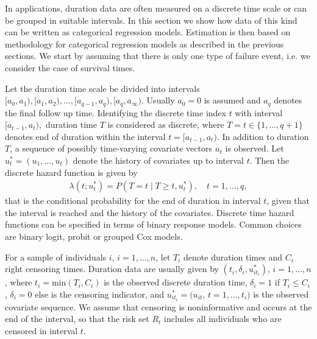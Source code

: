 \documentclass[11pt,a4paper,twoside]{bayesxarticle}
\begin{document}
In applications, duration data are often measured on a discrete time
scale or can be grouped in suitable intervals. In this section we
show how data of this kind can be written as categorical regression
models. Estimation is then based on methodology for categorical
regression models as described in the previous sections. We start by
assuming that there is only one type of failure event, i.e. we
consider the case of survival times.

Let the duration time scale be divided into intervals $\lbrack
a_{0},a_{1}),\lbrack a_{1},a_{2}),\ldots, \lbrack a_{q-1},a_{q}),
\lbrack a_{q},a_{\infty}).$ Usually $a_{0}=0$ is assumed and $a_{q}$
denotes the final follow up time. Identifying the discrete time
index $t$ with interval $\lbrack a_{t-1},a_{t}),$ duration time $T$
is considered as discrete, where $T=t\in \{1,\ldots,q+1\}$ denotes
end of duration within the interval $t=\lbrack a_{t-1},a_{t}).$ In
addition to duration $T$, a sequence of possibly time-varying
covariate vectors $u_t$ is observed. Let
$u_t^*=(u_{1},\ldots,u_{t})$ denote the history of covariates up to
interval $t$. Then the discrete hazard function is given by
\begin{eqnarray*}
\lambda(t;u_t^*)=P(T=t\mid T \geq t,u_t^*), \quad t=1,\ldots,q,
\end{eqnarray*}
that is the conditional probability for the end of duration in
interval $t$, given that the interval is reached and the history of
the covariates. Discrete time hazard functions can be specified in
terms of binary response models. Common choices are binary logit,
probit or grouped Cox models.

For a sample of individuals $i$, $i=1,\ldots,n$, let $T_{i}$ denote
duration times and $C_{i}$ right censoring times. Duration data are
usually given by $(t_{i},\delta_{i},u_{it_{i}}^*)$, $i =
1,\ldots,n$, where $t_{i}=\mbox{min}(T_{i},C_{i})$ is the observed
discrete duration time, $\delta_{i}=1$ if $T_{i}\le C_{i}$,
$\delta_{i}=0$ else is the censoring indicator, and
$u_{it_{i}}^*=(u_{it}$, $t=1,\ldots,t_{i})$ is the observed
covariate sequence. We assume that censoring is noninformative and
occurs at the end of the interval, so that the risk set $R_{t}$
includes all individuals who are censored in interval $t$.
\end{document}
